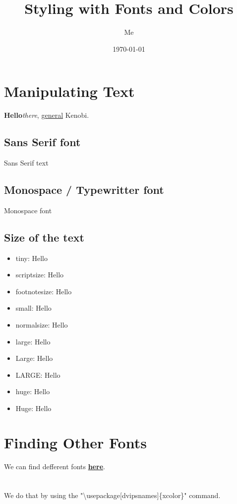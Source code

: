\documentclass[12pt, titlepage]{article}
\title{{\ttfamily \Huge Styling with {\calligra Fonts} and {\color{nextColor}Colors}}}
\author{Me}
\date{\today}
\begin{document}
\maketitle

\newpage
\thispagestyle{empty}
\tableofcontents
\newpage

\section{Manipulating Text}
\textbf{Hello}\textit{there}, \underline{general} Kenobi.
\subsection{Sans Serif font}
{\sffamily Sans Serif text}

\subsection{Monospace / Typewritter font}
{\ttfamily Monospace font}

\subsection{Size of the text}
\begin{itemize}
    \item tiny: {\tiny Hello}
    \item scriptsize: {\scriptsize Hello}
    \item footnotesize: {\footnotesize Hello}
    \item small: {\small Hello}
    \item normalsize: {\normalsize Hello}
    \item large: {\large Hello}
    \item Large: {\Large Hello}
    \item LARGE: {\LARGE Hello}
    \item huge: {\huge Hello}
    \item Huge: {\Huge Hello}
\end{itemize}

\section{{\calligra Finding Other Fonts}}
We can find defferent fonts \href{https://tug.org/FontCatalogue/}{\textbf{here}}.

\newpage
\section{\color{red}{Setting Basic Colors}}
We do that by using the "\textbackslash usepackage[dvipsnames]\{xcolor\}" {\color{OliveGreen}command}.
\end{document}
